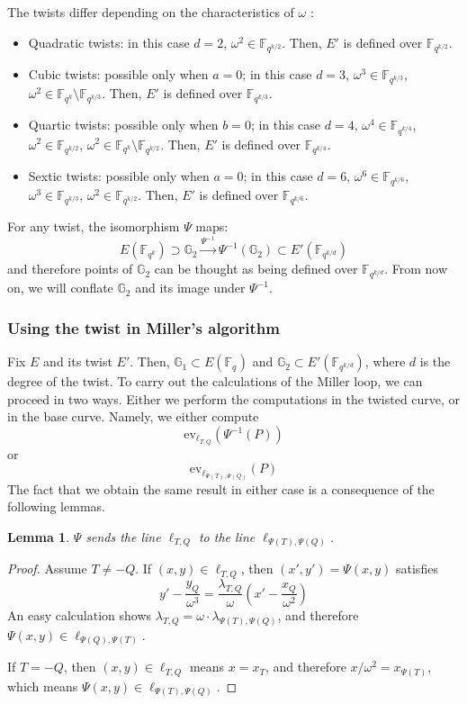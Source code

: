 \documentclass{article}
\newcommand{\gOne}{\mathbb{G}_1}
\newcommand{\gTwo}{\mathbb{G}_2}
\newcommand{\ev}{\mathrm{ev}}
\newcommand{\fq}[1]{\mathbb{F}_{q^{#1}}}
\theoremstyle{remark}
\theoremstyle{plain}
\newtheorem{lemma}{Lemma}[section]
\begin{document}
The twists differ depending on the characteristics of $\omega$ \cite[Sec. 4.3]{C-pairings}:
\begin{itemize}
    \item Quadratic twists: in this case $d=2$, $\omega^2 \in \fq{k/2}$. Then, $E'$ is defined over $\fq{k/2}$.
    \item Cubic twists: possible only when $a = 0$; in this case $d=3$, $\omega^3 \in \fq{k/3}$, $\omega^2 \in \fq{k} \setminus \fq{k/3}$. Then, $E'$ is defined over $\fq{k/3}$.
    \item Quartic twists: possible only when $b = 0$; in this case $d=4$, $\omega^4 \in \fq{k/4}$, $\omega^2 \in \fq{k/2}$, $\omega^2 \in \fq{k} \setminus \fq{k/2}$. Then, $E'$ is defined over $\fq{k/4}$.
    \item Sextic twists: possible only when $a = 0$; in this case $d=6$, $\omega^6 \in \fq{k/6}$, $\omega^3 \in \fq{k/3}$, $\omega^2 \in \fq{k/2}$. Then, $E'$ is defined over $\fq{k/6}$.
\end{itemize}

For any twist, the isomorphism $\Psi$ maps:
\[
    E(\fq{k}) \supset \gTwo \overset{\Psi^{-1}}{\longrightarrow} \Psi^{-1}(\gTwo) \subset E'(\fq{k/d})
\]
and therefore points of $\gTwo$ can be thought as being defined over $\fq{k/d}$.
From now on, we will conflate $\gTwo$ and its image under $\Psi^{-1}$.

\subsubsection{Using the twist in Miller's algorithm}

Fix $E$ and its twist $E'$.
Then, $\gOne \subset E(\fq{})$ and $\gTwo \subset E'(\fq{k/d})$, where $d$ is the degree of the twist.
To carry out the calculations of the Miller loop, we can proceed in two ways.
Either we perform the computations in the twisted curve, or in the base curve.
Namely, we either compute
\[
    \ev_{\ell_{T,Q}}(\Psi^{-1}(P))
\]
or
\[
    \ev_{\ell_{\Psi(T),\Psi(Q)}}(P)
\]
The fact that we obtain the same result in either case is a consequence of the following lemmas.

\begin{lemma}
    $\Psi$ sends the line $\ell_{T,Q}$ to the line $\ell_{\Psi(T),\Psi(Q)}$.
\end{lemma}

\begin{proof}
    Assume $T \neq -Q$.
    If $(x,y) \in \ell_{T,Q}$, then $(x',y') = \Psi(x,y)$ satisfies
    \[
        y' - \frac{y_Q}{\omega^3} = \frac{\lambda_{T,Q}}{\omega} \left( x' - \frac{x_Q}{\omega^2} \right)
    \]
    An easy calculation shows $\lambda_{T,Q} = \omega \cdot \lambda_{\Psi(T),\Psi(Q)}$, and therefore $\Psi(x,y) \in \ell_{\Psi(Q),\Psi(T)}$.
    
    If $T = -Q$, then $(x,y) \in \ell_{T,Q}$ means $x = x_T$, and therefore $x / \omega^2 = x_{\Psi(T)}$, which means $\Psi(x,y) \in \ell_{\Psi(T),\Psi(Q)}$.
\end{proof}
\end{document}
